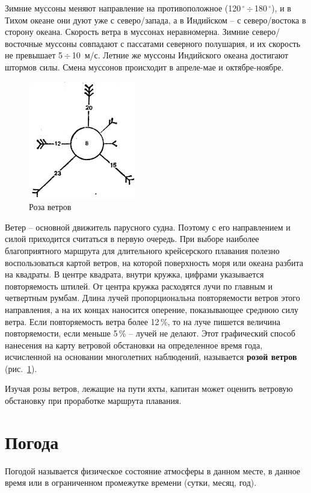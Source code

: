 \documentclass[a4paper, 12pt, twoside, final, book, russian, fittopage, cyremdash]{ncc}
\newcommand{\gr}{\ensuremath{\,^\circ}\xspace}
\newcommand{\otdo}{\,\ensuremath{\div}\,}
\newcommand{\ris}[1]{\ref{fig:#1}}
\begin{document}
Зимние муссоны меняют направление на противоположное (120\gr\otdo 180\gr), и в Тихом океане они дуют уже с северо\-/запада, а в Индийском \--- с северо\-/востока в сторону океана. Скорость ветра в муссонах неравномерна. Зимние северо\-/восточные муссоны совпадают с пассатами северного полушария, и их скорость не превышает 5\otdo 10~м/с. Летние же муссоны Индийского океана достигают штормов силы. Смена муссонов происходит в апреле\--мае и октябре\--ноябре.

\begin{figure}[htb]
  \centering{}
  \includegraphics[scale=1.2]{0120P}
  \caption{Роза ветров}
  \label{fig:120}
\end{figure}

Ветер \--- основной движитель парусного судна. Поэтому с его направлением и силой приходится считаться в первую очередь. При выборе наиболее благоприятного маршрута для длительного крейсерского плавания полезно воспользоваться картой ветров, на которой поверхность моря или океана разбита на квадраты. В центре квадрата, внутри кружка, цифрами указывается повторяемость штилей. От центра кружка расходятся лучи по главным и четвертным румбам. Длина лучей пропорциональна повторяемости ветров этого направления, а на их концах наносится оперение, показывающее среднюю силу ветра. Если повторяемость ветра более 12\,\%, то на луче пишется величина повторяемости, если меньше 5\,\% \--- лучей не делают. Этот графический способ нанесения на карту ветровой обстановки на определенное время года, исчисленной на основании многолетних наблюдений, называется \textbf{розой ветров} (рис.~\ris{120}).

Изучая розы ветров, лежащие на пути яхты, капитан может оценить ветровую обстановку при проработке маршрута плавания.

\section{Погода}

Погодой называется физическое состояние атмосферы в данном месте, в данное время или в ограниченном промежутке времени (сутки, месяц, год).
\end{document}
